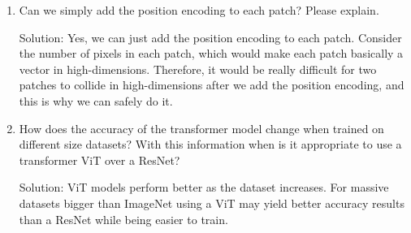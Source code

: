 \documentclass{article}
\begin{document}
\begin{enumerate}[label=(\alph*)]
\color{black}
\item Can we simply add the position encoding to each patch? Please explain.\par
\color{blue} Solution: Yes, we can just add the position encoding to each patch. Consider the number of pixels in each patch, which would make each patch basically a vector in high-dimensions. Therefore, it would be really difficult for two patches to collide in high-dimensions after we add the position encoding, and this is why we can safely do it.
\medbreak

\color{black}
\item How does the accuracy of the transformer model change when trained on different size datasets? With this information when is it appropriate to use a transformer ViT over a ResNet?\par
\color{blue}
Solution: ViT models perform better as the dataset increases. For massive datasets bigger than ImageNet using a ViT may yield better accuracy results than a ResNet while being easier to train.
\medbreak

\end{enumerate}

\bigbreak
\end{document}
